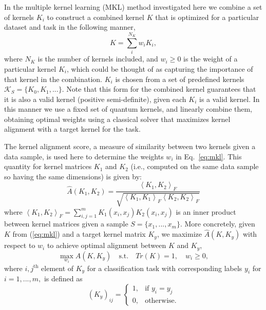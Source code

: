 \documentclass[reprint,amsfonts, amssymb, amsmath,  showkeys, nofootinbib,pra, superscriptaddress, twocolumn,longbibliography]{revtex4-2}
\begin{document}
In the multiple kernel learning (MKL) method investigated here we combine a set of kernels $K_i$ to construct a combined kernel $K$ that is optimized for a particular dataset and task in the following manner,
\begin{equation}
  \label{eq:mkl}
  {K = \sum_i^{N_K}  w_i K_i,}
\end{equation}
where $N_K$ is the number of kernels included, and $w_i \ge 0$ is the weight of a particular kernel $K_i$, which could be thought of as capturing the importance of that kernel in the combination.
$K_i$ is chosen from a set of predefined kernels $\mathcal{K}_S=\{ K_0, K_1, ... \}$.   Note that this form for the combined kernel guarantees that it is also a valid kernel (positive semi-definite), given each $K_i$ is a valid kernel.  
In this manner we use a fixed set of quantum kernels, and linearly combine them, obtaining optimal weights using a classical solver that maximizes kernel alignment with a target kernel for the task.

The kernel alignment score, a measure of similarity between two kernels given a data sample, is used here to determine the weights $w_i$ in Eq.~\ref{eq:mkl}.
This quantity for kernel matrices $K_1$ and $K_2$ (i.e., computed on the same data sample so having the same dimensions) is given by: 
\begin{equation}
  \label{eq:kernel alignment}
  {\hat{A}(K_1,K_2) = \frac{\left<K_1,K_2 \right>_F}{\sqrt{\left<K_1,K_1 \right>_F\left<K_2,K_2 \right>_F}}}
\end{equation}
where $\left<K_1,K_2 \right>_F=\sum_{i,j=1}^mK_1(x_i,x_j)K_2(x_i,x_j)$ is an inner product between kernel matrices given a sample $S=\{ x_1,...,x_m \}$.
More concretely, given $K$ from (\ref{eq:mkl}) and a target kernel matrix $K_y$, we maximize $\hat{A}(K,K_y)$ with respect to $w_i$ to achieve optimal alignment between $K$ and $K_y$,
\begin{equation}
  \label{eq:ka-optimization}
  \max_{w_i} A\left( K,K_y \right) \quad \textrm{s.t.} \quad Tr(K)=1, \quad w_i \ge 0,
\end{equation}
where $i,j^\text{th}$ element of $K_y$ for a classification task with corresponding labels $y_i$ for $i = 1, ..., m,$ is defined as
\begin{equation}
  \label{eq:target-kernel}
  (K_y)_{ij} = 
  \begin{cases}
  1, &\text{if } y_i = y_j \\
  0, &\text{otherwise}.
  \end{cases}
\end{equation}
\end{document}
